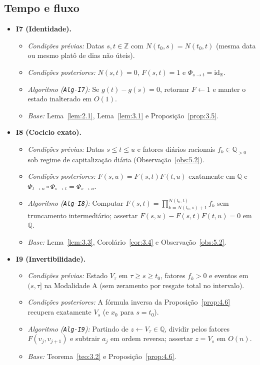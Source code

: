 \documentclass[11pt, a4paper]{article}
\theoremstyle{definition}
\theoremstyle{plain}
\theoremstyle{remark}
\begin{document}
\subsection{Tempo e fluxo}

\begin{itemize}
    \item \textbf{I7 (Identidade).}
    \begin{itemize}
        \item \emph{Condições prévias:} Datas $s, t \in \mathbb{Z}$ com $N(t_0, s) = N(t_0, t)$ (mesma data ou mesmo platô de dias não úteis).
        \item \emph{Condições posteriores:} $N(s,t) = 0$, $F(s,t) = 1$ e $\Phi_{s \to t} = \mathrm{id}_{\mathbb{R}}$.
        \item \emph{Algoritmo (\texttt{Alg-I7}):} Se $g(t) - g(s) = 0$, retornar $F \leftarrow 1$ e manter o estado inalterado em $O(1)$.
        \item \emph{Base:} Lema~\ref{lem:2.1}, Lema~\ref{lem:3.1} e Proposição~\ref{prop:3.5}.
    \end{itemize}

    \item \textbf{I8 (Cociclo exato).}
    \begin{itemize}
        \item \emph{Condições prévias:} Datas $s \le t \le u$ e fatores diários racionais $f_k \in \mathbb{Q}_{>0}$ sob regime de capitalização diária (Observação~\ref{obs:5.2}).
        \item \emph{Condições posteriores:} $F(s,u) = F(s,t)F(t,u)$ exatamente em $\mathbb{Q}$ e $\Phi_{t \to u} \circ \Phi_{s \to t} = \Phi_{s \to u}$.
        \item \emph{Algoritmo (\texttt{Alg-I8}):} Computar $F(s,t) = \prod_{k=N(t_0,s)+1}^{N(t_0,t)} f_k$ sem truncamento intermediário; assertar $F(s,u) - F(s,t)F(t,u) = 0$ em $\mathbb{Q}$.
        \item \emph{Base:} Lema~\ref{lem:3.3}, Corolário~\ref{cor:3.4} e Observação~\ref{obs:5.2}.
    \end{itemize}

    \item \textbf{I9 (Invertibilidade).}
    \begin{itemize}
        \item \emph{Condições prévias:} Estado $V_\tau$ em $\tau \ge s \ge t_0$, fatores $f_k > 0$ e eventos em $(s, \tau]$ na Modalidade A (sem zeramento por resgate total no intervalo).
        \item \emph{Condições posteriores:} A fórmula inversa da Proposição~\ref{prop:4.6} recupera exatamente $V_s$ (e $x_0$ para $s = t_0$).
        \item \emph{Algoritmo (\texttt{Alg-I9}):} Partindo de $z \leftarrow V_\tau \in \mathbb{Q}$, dividir pelos fatores $F(v_j, v_{j+1})$ e subtrair $a_j$ em ordem reversa; assertar $z = V_s$ em $O(n)$.
        \item \emph{Base:} Teorema~\ref{teo:3.2} e Proposição~\ref{prop:4.6}.
    \end{itemize}


\end{itemize}
\end{document}

